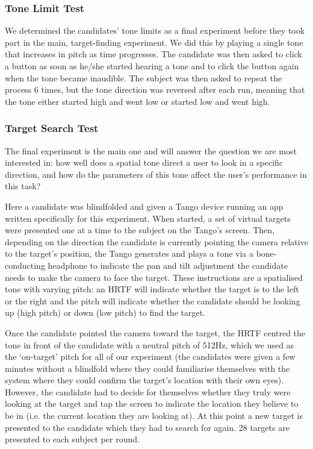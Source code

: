 \documentclass[format=sigconf, review=true, screen=true, anonymous=true]{acmart}
\begin{document}
\subsubsection{Tone Limit Test}

We determined the candidates' tone limits as a final experiment before they took part in the  main, target-finding experiment. We did this by playing a single tone that increases in pitch as time progresses. The candidate was then asked to click a button as soon as he/she started hearing a tone and to click the button again when the tone became inaudible. The subject was then asked to repeat the process 6 times, but the tone direction was reversed after each run, meaning that the tone either started high and went low or started low and went high. 

\subsubsection{Target Search Test}

The final experiment is the main one and will answer the question we are most interested in: how well does a spatial tone direct a user to look in a specific direction, and how do the parameters of this tone affect the user's performance in this task? 

Here a candidate was blindfolded and given a Tango device running an app written specifically for this experiment. When started, a set of virtual targets were presented one at a time to the subject on the Tango's screen. Then, depending on the direction the candidate is currently pointing the camera relative to the target's position, the Tango generates and plays a tone via a bone-conducting headphone to indicate the pan and tilt adjustment the candidate needs to make the camera to face the target. These instructions are a spatialised tone with varying pitch: an HRTF will indicate whether the target is to the left or the right and the pitch will indicate whether the candidate should be looking up (high pitch) or down (low pitch) to find the target. 

Once the candidate pointed the camera toward the target, the HRTF centred the tone in front of the candidate with a neutral pitch of 512Hz, which we used as the `on-target' pitch for all of our experiment (the candidates were given a few minutes without a blindfold where they could familiarise themselves with the system where they could confirm the target's location with their own eyes). However, the candidate had to decide for themselves whether they truly were looking at the target and tap the screen to indicate the location they believe to be in (i.e. the current location they are looking at). At this point a new target is presented to the candidate which they had to search for again. 28 targets are presented to each subject per round. 
\end{document}
